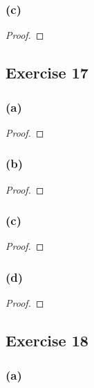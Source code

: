 \documentclass[14pt]{extarticle}
\begin{document}
\subsubsection{(c)}

\begin{proof}

\end{proof}

\subsection{Exercise 17}

\subsubsection{(a)}

\begin{proof}

\end{proof}

\subsubsection{(b)}

\begin{proof}

\end{proof}

\subsubsection{(c)}

\begin{proof}

\end{proof}

\subsubsection{(d)}

\begin{proof}

\end{proof}

\subsection{Exercise 18}

\subsubsection{(a)}
\end{document}
